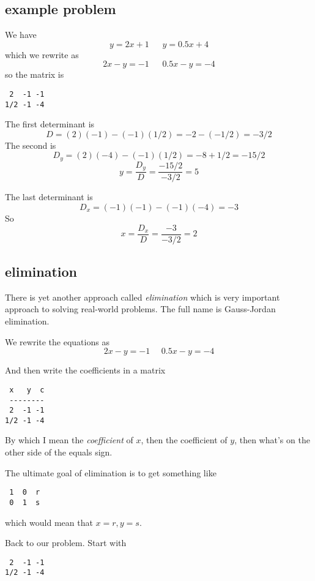 \documentclass[11pt, oneside]{article}
\begin{document}
\subsection*{example problem}

We have
\[ y = 2x + 1 \ \ \ \ \ \ \ y = 0.5x + 4 \]
which we rewrite as
\[ 2x - y = -1 \ \ \ \ \ \ \ 0.5x - y = -4 \]
so the matrix is
\begin{verbatim}
 2  -1 -1
1/2 -1 -4
\end{verbatim}

The first determinant is 
\[ D = (2)(-1) - (-1)(1/2) = -2 - (-1/2) = -3/2 \]
The second is
\[ D_y = (2)(-4) - (-1)(1/2) = -8 + 1/2 = -15/2 \]
\[ y = \frac{D_y}{D} = \frac{-15/2}{-3/2} = 5 \]

The last determinant is
\[ D_x = (-1)(-1) - (-1)(-4) = -3 \]
So
\[ x = \frac{D_x}{D} = \frac{-3}{-3/2} = 2 \]

\subsection*{elimination}

There is yet another approach called \emph{elimination} which is very important approach to solving real-world problems. The full name is Gauss-Jordan elimination.

We rewrite the equations as
\[ 2x - y = - 1 \ \ \ \ \ \ 0.5 x - y = -4  \]

And then write the coefficients in a matrix
\begin{verbatim}
 x   y  c
 --------
 2  -1 -1
1/2 -1 -4
\end{verbatim}
By which I mean the \emph{coefficient} of $x$, then the coefficient of $y$, then what's on the other side of the equals sign.

The ultimate goal of elimination is to get something like
\begin{verbatim}
 1  0  r
 0  1  s
\end{verbatim}
which would mean that $x = r, y = s$.  

Back to our problem.  Start with
\begin{verbatim}
 2  -1 -1
1/2 -1 -4
\end{verbatim}
\end{document}
